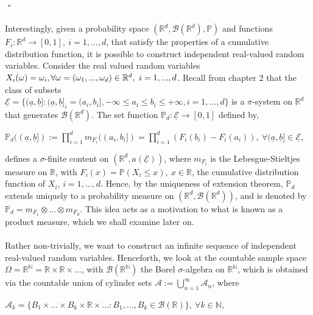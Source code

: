 \documentclass{article}
\begin{document}
${}$ \hfill $\square$\\\\
Interestingly, given a probability space $(\mathbb{R}^d,\mathcal{B}(\mathbb{R}^d),\mathbb{P})$ and functions $F_i: \mathbb{R}^d \to [0,1], \ i=1,...,d$, that satisfy the properties of a cumulative distribution function, it is possible to construct independent real-valued random variables. Consider the real valued random variables $X_i(\omega) = \omega_i, \\ \forall \omega = (\omega_1,...,\omega_d) \in \mathbb{R}^d, \ i=1,...,d$. Recall from chapter 2 that the class of subsets \\ $\underline{\mathcal{E}} = \{(\underline{a},\underline{b}]: (\underline{a},\underline{b}]_i = ({a}_i,{b}_i], -\infty \leq a_i \leq b_i \leq +\infty, i=1,...,d\}$ is a $\pi$-system on $\mathbb{R}^d$ that generates $\mathcal{B}(\mathbb{R}^d)$. The set function $\mathbb{P}_d: \underline{\mathcal{E}} \to [0,1]$ defined by,
\begin{center}
	$\mathbb{P}_d((\underline{a},\underline{b}]) := \prod_{i=1}^{d}m_{F_i}((a_i,b_i]) = \prod_{i=1}^{d}(F_i(b_i) - F_i(a_i)), \ \forall (\underline{a},\underline{b}] \in \underline{\mathcal{E}}$,
\end{center}
defines a $\sigma$-finite content on $(\mathbb{R}^d,a(\underline{\mathcal{E}}))$, where $m_{F_i}$ is the Lebesgue-Stieltjes measure on $\mathbb{R}$, with $F_i(x) = \mathbb{P}(X_i \leq x), \ x\in\mathbb{R}$, the cumulative distribution function of $X_i$, $i=1,...,d$. Hence, by the uniqueness of extension theorem, $\mathbb{P}_d$ extends uniquely to a probability measure on $(\mathbb{R}^d,\mathcal{B}(\mathbb{R}^d))$, and is denoted by $\mathbb{P}_d = m_{F_1} \otimes ... \otimes m_{F_d}$. This idea acts as a motivation to what is known as a product measure, which we shall examine later on.\\\\
Rather non-trivially, we want to construct an infinite sequence of independent real-valued random variables. Henceforth, we look at the countable sample space $\Omega = \mathbb{R}^{\mathbb{N}} = \mathbb{R} \times \mathbb{R} \times ...$, with $\mathcal{B}(\mathbb{R}^{\mathbb{N}})$ the Borel $\sigma$-algebra on $\mathbb{R}^{\mathbb{N}}$, which is obtained via the countable union of cylinder sets $\mathcal{A} := \bigcup_{n=1}^{\infty}\mathcal{A}_n$, where
\begin{center}
	$\mathcal{A}_k = \{B_1 \times ... \times B_k \times \mathbb{R} \times ... : B_1,...,B_k \in \mathcal{B}(\mathbb{R})\}, \ \forall k \in \mathbb{N}$,
\end{center}
\end{document}
